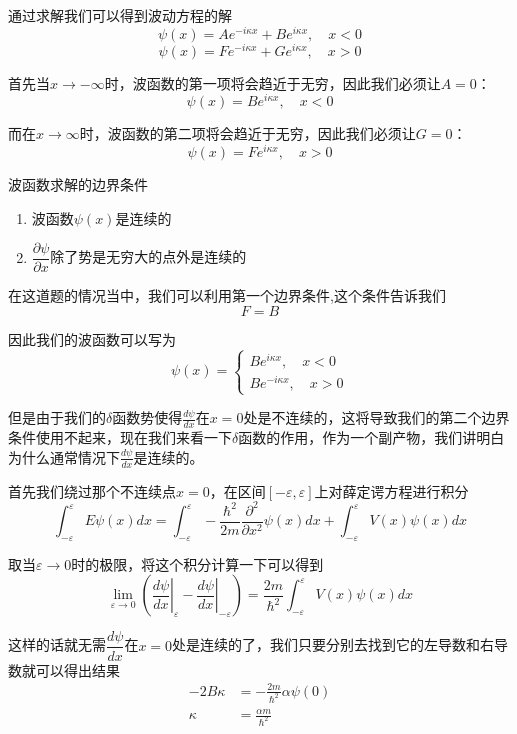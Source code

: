 \documentclass{article}
\begin{document}
通过求解我们可以得到波动方程的解
\[
	\psi(x)=Ae^{-i\kappa x}+Be^{i\kappa x},\quad x<0
\]
\[\psi(x)=Fe^{-i\kappa x}+Ge^{i\kappa x},\quad x>0\]

首先当$x\to-\infty$时，波函数的第一项将会趋近于无穷，因此我们必须让$A=0$：
\[
	\psi(x)=Be^{i\kappa x},\quad x<0
\]

而在$x\to\infty$时，波函数的第二项将会趋近于无穷，因此我们必须让$G=0$：
\[
	\psi(x)=Fe^{i\kappa x},\quad x>0
\]




波函数求解的边界条件
\begin{enumerate}
	\item 波函数$\psi(x)$是连续的
	\item $\dfrac{\partial\psi}{\partial x}$除了势是无穷大的点外是连续的
\end{enumerate}

在这道题的情况当中，我们可以利用第一个边界条件,这个条件告诉我们
\[F=B\]

因此我们的波函数可以写为
\begin{equation*}
	\psi(x)=
	\begin{cases}
		Be^{i\kappa x},\quad x<0 \\
		Be^{-i\kappa x},\quad x>0
	\end{cases}
\end{equation*}


但是由于我们的$\delta$函数势使得$\frac{d\psi}{dx}$在$x=0$处是不连续的，这将导致我们的第二个边界条件使用不起来，现在我们来看一下$\delta$函数的作用，作为一个副产物，我们讲明白为什么通常情况下$\frac{d\psi}{dx}$是连续的。

首先我们绕过那个不连续点$x=0$，在区间$[-\varepsilon,\varepsilon]$上对薛定谔方程进行积分
\[
	\int_{-\varepsilon}^{\varepsilon}E\psi(x)dx=\int_{-\varepsilon}^{\varepsilon}-\frac{\hbar^2}{2m}\frac{\partial^2}{\partial x^2}\psi(x)dx+\int_{-\varepsilon}^{\varepsilon}V(x)\psi(x)dx
\]

取当$\varepsilon\to 0$时的极限，将这个积分计算一下可以得到
\[
	\lim_{\varepsilon\to0}\left(\left.\frac{d\psi}{dx}\right|_{\varepsilon}-\left.\frac{d\psi}{dx}\right|_{-\varepsilon}\right)=\frac{2m}{\hbar^2}\int_{-\varepsilon}^{\varepsilon}V(x)\psi(x)dx
\]

这样的话就无需$\dfrac{d\psi}{dx}$在$x=0$处是连续的了，我们只要分别去找到它的左导数和右导数就可以得出结果
\begin{align*}
	-2B\kappa & =-\frac{2m}{\hbar^2}\alpha\psi(0) \\
	\kappa    & =\frac{\alpha m}{\hbar^2}
\end{align*}
\end{document}
